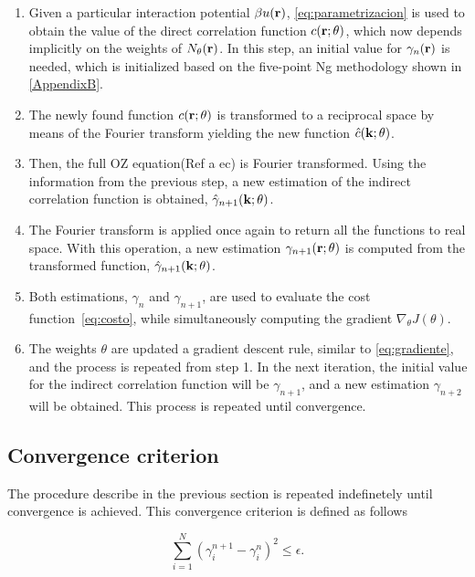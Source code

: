 \begin{enumerate}
    \item Given a particular interaction potential $\beta u(\mathbf{r})$, \autoref{eq:parametrizacion} is used to obtain the value of the direct correlation function $c(\mathbf{r}; \theta)$, which now depends implicitly on the weights of $N_{\theta}(\mathbf{r})$. In this step, an initial value for $\gamma_{n}(\mathbf{r})$ is needed, which is initialized based on the five-point Ng methodology shown in \autoref{AppendixB}.
    \item The newly found function $c(\mathbf{r}; \theta)$ is transformed to a reciprocal space by means of the Fourier transform yielding the new function $\hat{c}(\mathbf{k}; \theta)$.
    \item Then, the full OZ equation(Ref a ec) is Fourier transformed. Using the information from the previous step, a new estimation of the indirect correlation function is obtained, $\hat{\gamma}_{n+1}(\mathbf{k}; \theta)$.
    \item The Fourier transform is applied once again to return all the functions to real space. With this operation, a new estimation $\gamma_{n+1}(\mathbf{r}; \theta)$ is computed from the transformed function, $\hat{\gamma}_{n+1}(\mathbf{k}; \theta)$.
    \item Both estimations, $\gamma_{n}$ and $\gamma_{n+1}$, are used to evaluate the cost function~\eqref{eq:costo}, while simultaneously computing the gradient $\nabla_{\theta} J(\theta)$.
    \item The weights $\theta$ are updated a gradient descent rule, similar to \autoref{eq:gradiente}, and the process is repeated from step 1. In the next iteration, the initial value for the indirect correlation function will be $\gamma_{n+1}$, and a new estimation $\gamma_{n+2}$ will be obtained. This process is repeated until convergence.
\end{enumerate}

\subsection{Convergence criterion}
The procedure describe in the previous section is repeated indefinetely until convergence
is achieved. This convergence criterion is defined as follows

\begin{equation}
    \sum_{i=1}^{N} {\left( \gamma^{n+1}_{i} - \gamma^{n}_{i} \right)}^2 \leq \epsilon .
    \label{eq:tolerancia}
\end{equation}

